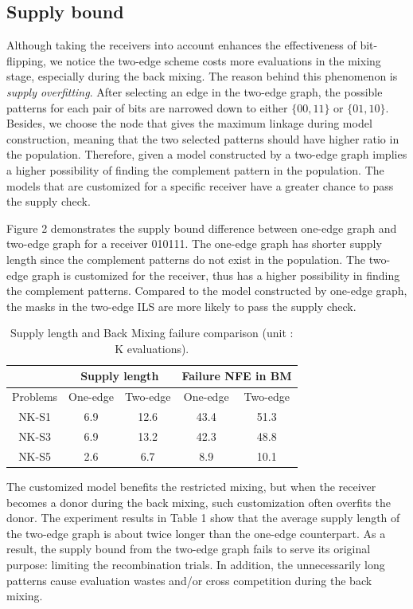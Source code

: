\documentclass{sig-alternate-05-2015}
\begin{document}
\subsection{Supply bound}
Although taking the receivers into account enhances the effectiveness of bit-flipping, we notice the two-edge scheme costs more evaluations in the mixing stage, especially during the back mixing. The reason behind this phenomenon is \textit{supply overfitting}. After selecting an edge in the two-edge graph, the possible patterns for each pair of bits are narrowed down to either $\{00, 11\}$ or $\{01, 10\}$. Besides, we choose the node that gives the maximum linkage during model construction, meaning that the two selected patterns should have higher ratio in the population. Therefore, given a model constructed by a two-edge graph implies a higher possibility of finding the complement pattern in the population. The models that are customized for a specific receiver have a greater chance to pass the supply check. 


Figure 2 demonstrates the supply bound difference between one-edge graph and two-edge graph for a receiver 010111. The one-edge graph has shorter supply length since the complement patterns do not exist in the population. The two-edge graph is customized for the receiver, thus has a higher possibility in finding the complement patterns. Compared to the model constructed by one-edge graph, the masks in the two-edge ILS are more likely to pass the supply check. 


\begin{table}[t!]
\begin{tabular}{|c|c|c|c|c|}
\hline
 &
\multicolumn{2}{c|}{Supply length} &
\multicolumn{2}{c|}{Failure NFE in BM} \\
\hline
Problems  & One-edge & Two-edge & One-edge & Two-edge \\\hline
NK-S1 &  6.9 &12.6  &43.4 & 51.3 \\\hline
NK-S3 & 6.9  & 13.2  &42.3 & 48.8 \\\hline
NK-S5 & 2.6  &6.7  &  8.9& 10.1 \\\hline

\end{tabular}
\caption{Supply length and Back Mixing failure comparison (unit : K evaluations).}
\end{table}


The customized model benefits the restricted mixing, but when the receiver becomes a donor during the back mixing, such customization often overfits the donor. The experiment results in Table 1 show that the average supply length of the two-edge graph is about twice longer than the one-edge counterpart. As a result, the supply bound from the two-edge graph fails to serve its original purpose: limiting the recombination trials. In addition, the unnecessarily long patterns cause evaluation wastes and/or cross competition during the back mixing. 
\end{document}
